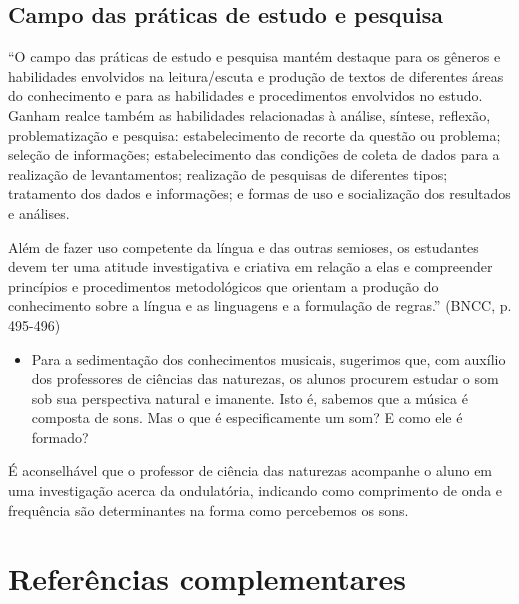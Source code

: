 \documentclass[12pt]{extarticle}
\begin{document}
\subsection{Campo das práticas de estudo e pesquisa }

``O campo das práticas de estudo e pesquisa mantém destaque para os
gêneros e habilidades envolvidos na leitura/escuta e produção de textos
de diferentes áreas do conhecimento e para as habilidades e
procedimentos envolvidos no estudo. Ganham realce também as habilidades
relacionadas à análise, síntese, reflexão, problematização e pesquisa:
estabelecimento de recorte da questão ou problema; seleção de
informações; estabelecimento das condições de coleta de dados para a
realização de levantamentos; realização de pesquisas de diferentes
tipos; tratamento dos dados e informações; e formas de uso e
socialização dos resultados e análises.

Além de fazer uso competente da língua e das outras semioses, os
estudantes devem ter uma atitude investigativa e criativa em relação a
elas e compreender princípios e procedimentos metodológicos que orientam
a produção do conhecimento sobre a língua e as linguagens e a formulação
de regras.'' (BNCC, p. 495-496)

\begin{itemize}
\item
  Para a sedimentação dos conhecimentos musicais, sugerimos que, com
  auxílio dos professores de ciências das naturezas, os alunos procurem
  estudar o som sob sua perspectiva natural e imanente. Isto é, sabemos
  que a música é composta de sons. Mas o que é especificamente um som? E
  como ele é formado?
\end{itemize}

É aconselhável que o professor de ciência das naturezas acompanhe o
aluno em uma investigação acerca da ondulatória, indicando como
comprimento de onda e frequência são determinantes na forma como
percebemos os sons.


\section{Referências complementares}
\end{document}
